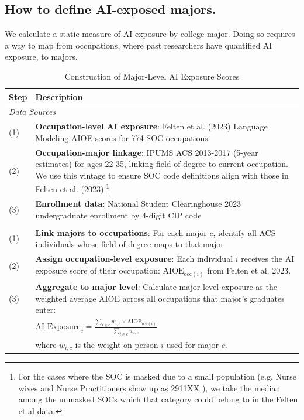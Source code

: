 \documentclass[12pt]{article}
\begin{document}

\subsection{How to define AI-exposed majors.}

We calculate a static measure of AI exposure by college major. Doing so requires a way to map from occupations, where past researchers have quantified AI exposure, to majors. 

\begin{table}[htbp]
   \centering
   \caption{Construction of Major-Level AI Exposure Scores}
   \label{tab:ai_exposure_construction}
   \small
   \begin{tabular}{@{}lp{10cm}@{}}
   \toprule
   \textbf{Step} & \textbf{Description} \\
   \midrule
   \multicolumn{2}{l}{\textit{Data Sources}} \\
   \quad (1) & \textbf{Occupation-level AI exposure}: Felten et al. (2023) Language Modeling AIOE scores for 774 SOC occupations \\
   \quad (2) & \textbf{Occupation-major linkage}: IPUMS ACS 2013-2017 (5-year estimates) for ages 22-35, linking field of degree to current occupation. We use this vintage to ensure SOC code definitions align with those in Felten et al. (2023).\footnote{For the cases where the SOC is masked due to a small population (e.g. Nurse wives and Nurse Practitioners show up as 2911XX ), we take the median among the unmasked SOCs which that category could belong to in the Felten et al data.}  \\
   \quad (3) & \textbf{Enrollment data}: National Student Clearinghouse 2023 undergraduate enrollment by 4-digit CIP code \\
   \addlinespace
   \multicolumn{2}{l}{\textit{Construction of Major-Level AI Exposure}} \\
   \addlinespace[0.1cm]
   \quad (1) & \textbf{Link majors to occupations}: For each major $c$, identify all ACS individuals whose field of degree maps to that major \\
   \addlinespace
   \quad (2) & \textbf{Assign occupation-level exposure}: Each individual $i$ receives the AI exposure score of their occupation: $\text{AIOE}_{\text{occ}(i)}$ from Felten et al. 2023. \\
   \addlinespace
   \quad (3) & \textbf{Aggregate to major level}: Calculate major-level exposure as the weighted average AIOE across all occupations that major's graduates enter: \\
   & \quad $\text{AI\_Exposure}_c = \frac{\sum_{i \in c} w_{i,c} \times \text{AIOE}_{\text{occ}(i)}}{\sum_{i \in c} w_{i,c}}$ \\
   & \quad where $w_{i,c}$ is the weight on person $i$ used for major $c$.  \\




\end{tabular}
\end{table}
\end{document}
